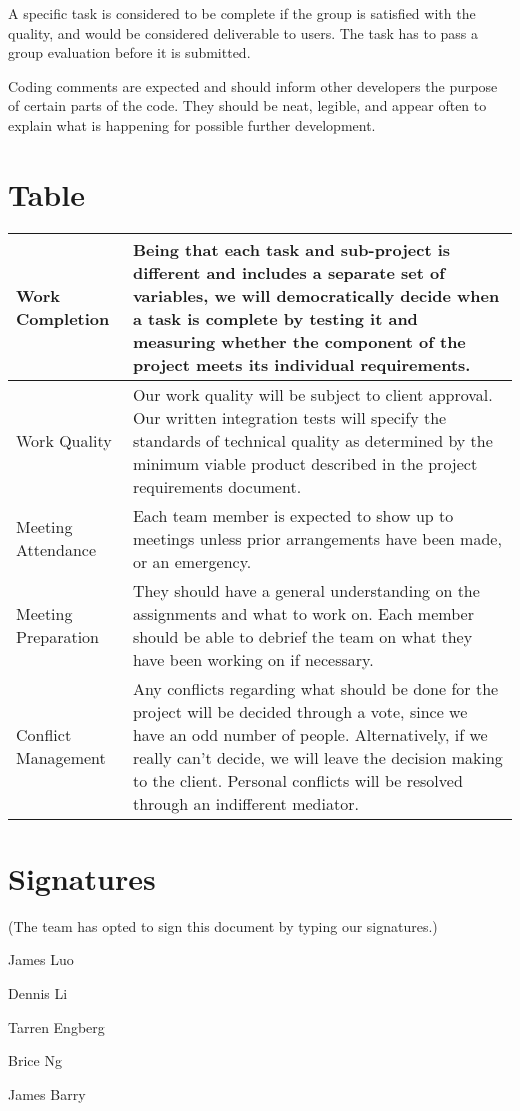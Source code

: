 \documentclass[draftclsnofoot, onecolumn,journal,letterpaper,10pt]{IEEEtran}
\begin{document}
A specific task is considered to be complete if the group is satisfied with the quality, and would be considered deliverable to users.  The task has to pass a group evaluation before it is submitted.

Coding comments are expected and should inform other developers the purpose of certain parts of the code. They should be neat, legible, and appear often to explain what is happening for possible further development.


\section{Table}

\begin{tabular} { |  m{8.2cm} | m{8.2cm}| }
 \hline
 Work Completion & Being that each task and sub-project is different and includes a separate set of variables, we will democratically decide when a task is complete by testing it and measuring whether the component of the project meets its individual requirements. \\
 \hline
 Work Quality & Our work quality will be subject to client approval. Our written integration tests will specify the standards of technical quality as determined by the minimum viable product described in the project requirements document. \\
 \hline
 Meeting Attendance & Each team member is expected to show up to meetings unless prior arrangements have been made, or an emergency. \\
 \hline
 Meeting Preparation & They should have a general understanding on the assignments and what to work on. Each member should be able to debrief the team on what they have been working on if necessary. \\
 \hline
 Conflict Management & Any conflicts regarding what should be done for the project will be decided through a vote, since we have an odd number of people. Alternatively, if we really can't decide, we will leave the decision making to the client. Personal conflicts will be resolved through an indifferent mediator. \\
 \hline
\end{tabular}

\section{Signatures}
(The team has opted to sign this document by typing our signatures.) 

James Luo

Dennis Li

Tarren Engberg

Brice Ng

James Barry
\end{document}
